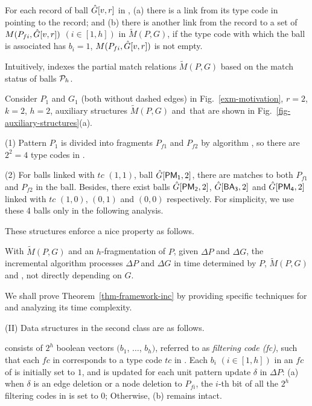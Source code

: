 For each record of ball $\hat{G}{[v,r]}$ in \bs, (a) there is a link from its type code in \fs pointing to the record; and
(b) there is another link from the record to a set of $M({P}_{fi}, \hat{G}{[v,r]})$ $(i\in [1,h])$ in $\tilde{M}(P,G)$,
if the type code with which the ball is associated has $b_i = 1$, \ie $M({P}_{fi}, \hat{G}{[v,r]})$ is not empty.

Intuitively, \fb indexes the partial match relations $\tilde{M}(P,G)$ based on the match status of balls \wrt ${\cal P}_h$.




\begin{example}
\label{exa-matchindex}
Consider $P_1$ and $G_1$ (both without dashed edges) in Fig.~\ref{exm-motivation}, $r=2$, $k=2$, $h=2$,
auxiliary structures $\tilde{M}(P,G)$ and \fb\,that are shown in Fig.~\ref{fig-auxiliary-structures}(a).

\ni (1) Pattern $P_1$ is divided into fragments $P_{f1}$ and $P_{f2}$ by algorithm ,
so there are $2^2=4$ type codes in \fs.

\ni (2) For balls linked with $tc$ $(1, 1)$, \eg ball $\hat{G}{[{\mathsf{PM_1}},2]}$,
there are matches to both $P_{f1}$ and $P_{f2}$ in the ball.
Besides, there exist balls $\hat{G}{[{\mathsf{PM_2}},2]}$, $\hat{G}{[{\mathsf{BA_3}},2]}$ and $\hat{G}{[{\mathsf{PM_4}},2]}$
linked with $tc$ $(1, 0)$, $(0, 1)$ and $(0, 0)$ respectively. 
%
For simplicity, we use these 4 balls only in the following analysis.
\end{example}


These structures enforce a nice property as follows.

\begin{theorem}
\label{thm-framework-inc}
With $\tilde{M}(P,G)$ and \fb \wrt an $h$-fragmentation of $P$, given $\Delta P$ and $\Delta G$,
the incremental algorithm \inc processes $\Delta P$ and $\Delta G$ in time
determined by $P$, $\tilde{M}(P,G)$ and \affballsx, not directly depending on $G$.
\end{theorem}

We shall prove Theorem~\ref{thm-framework-inc} by providing specific techniques for \inc and analyzing its time complexity.



\stab(II) Data structures in the second class are as follows.

\vspace{0.5ex}
 consists of $2^{h}$ boolean vectors $(b_1$, $\ldots$, $b_h)$, referred to as {\em filtering code (fc)},
such that each $fc$ in \bfc corresponds to a type code $tc$ in \fs.
Each $b_i$ $(i\in [1, h])$ in an $fc$ of \bfc is initially set to $1$,
and is updated for each unit pattern update $\delta$ in $\Delta P$:
(a) when $\delta$ is an edge deletion or a node deletion to ${P}_{fi}$,
the $i$-th bit of all the $2^{h}$ filtering codes in \bfc is set to $0$; Otherwise, (b) \bfc remains intact.


